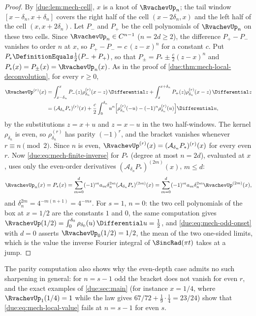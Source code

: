 \documentclass[11pt,oneside]{article}
\theoremstyle{plain}
\theoremstyle{definition}
\theoremstyle{remark}
\newcommand{\upn}[1]{\RvachevUp_{#1}}
\newcommand{\am}[1]{a_{#1}}                                 %
\begin{document}
\begin{proof}
By \cref{due:lem:mech-cell}, \(x\) is a knot of \(\upn{n}\); the tail window
\([x-\delta_n,x+\delta_n]\) covers the right half of the cell
\((x-2\delta_n,x)\) and the left half of the cell \((x,x+2\delta_n)\).  Let
\(P_-\) and \(P_+\) be the cell polynomials of \(\upn{n}\) on these two cells.
Since \(\upn{n}\in C^{n-1}\) (\(n=2d\ge2\)), the difference \(P_+-P_-\)
vanishes to order \(n\) at \(x\), so \(P_+-P_-=c\,(z-x)^{n}\) for a constant
\(c\).  Put \(P_*\DefinitionEquals\tfrac12(P_-+P_+)\), so that
\(P_\pm=P_*\pm\tfrac c2(z-x)^{n}\) and \(P_*(x)=P_\pm(x)=\upn{n}(x)\).  As in
the proof of \cref{due:thm:mech-local-deconvolution}, for every \(r\ge0\),
\begin{align*}
 \RvachevUp^{(r)}(x)
 &=\int_{x-\delta_n}^{x}P_-(z)\rho_{\delta_n}^{(r)}(x-z)\,\Differential z
  +\int_{x}^{x+\delta_n}P_+(z)\rho_{\delta_n}^{(r)}(x-z)\,\Differential z\\
 &=(\mathcal A_{\delta_n}P_*)^{(r)}(x)
  +\frac c2\int_{0}^{\delta_n}u^{n}\Bigl[\rho_{\delta_n}^{(r)}(-u)-(-1)^{n}\rho_{\delta_n}^{(r)}(u)\Bigr]\Differential u,
\end{align*}
by the substitutions \(z=x+u\) and \(z=x-u\) in the two half-windows.  The
kernel \(\rho_{\delta_n}\) is even, so \(\rho_{\delta_n}^{(r)}\) has parity
\((-1)^{r}\), and the bracket vanishes whenever \(r\equiv n\pmod2\).  Since
\(n\) is even, \(\RvachevUp^{(r)}(x)=(\mathcal A_{\delta_n}P_*)^{(r)}(x)\)
for every even \(r\).  Now \cref{due:eq:mech-finite-inverse} for \(P_*\)
(degree at most \(n=2d\)), evaluated at \(x\), uses only the even-order
derivatives \((\mathcal A_{\delta_n}P_*)^{(2m)}(x)\), \(m\le d\):
\[
 \upn{n}(x)=P_*(x)=\sum_{m=0}^{d}(-1)^{m}\am{m}\delta_n^{2m}
 (\mathcal A_{\delta_n}P_*)^{(2m)}(x)
 =\sum_{m=0}^{d}(-1)^{m}\am{m}\delta_n^{2m}\RvachevUp^{(2m)}(x),
\]
and \(\delta_n^{2m}=4^{-m(n+1)}=4^{-ms}\).  For \(s=1\), \(n=0\): the two
cell polynomials of the box at \(x=1/2\) are the constants \(1\) and \(0\),
the same computation gives \(\RvachevUp(1/2)=\int_0^{\delta_0}\rho_{\delta_0}(u)\,\Differential u
=\tfrac12\), and \cref{due:eq:mech-odd-onset} with \(d=0\) asserts
\(\upn{0}(1/2)=1/2\), the mean of the two one-sided limits, which is the
value the inverse Fourier integral of \(\SincRad(\pi t)\) takes at a jump.
\end{proof}

The parity computation also shows why the even-depth case admits no such
sharpening in general: for \(n=s-1\) odd the bracket does not vanish for even
\(r\), and the exact examples of \cref{due:sec:main} (for instance
\(x=1/4\), where \(\upn{1}(1/4)=1\) while the law gives
\(67/72+\tfrac19\cdot\tfrac14=23/24\)) show that
\cref{due:eq:mech-local-value} fails at \(n=s-1\) for even \(s\).
\end{document}
